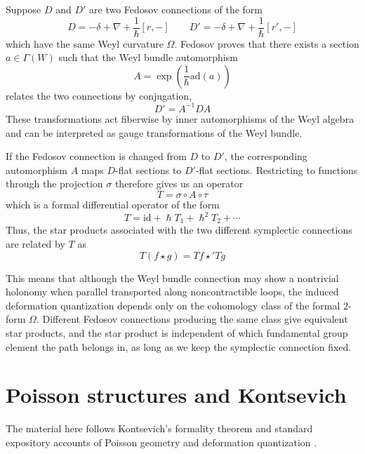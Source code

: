 \documentclass[
  12pt,
  a4paper, oneside
]{report}
\renewcommand{\hbar}{\hslash}
\theoremstyle{bolddef}
\theoremstyle{remark}
\numberwithin{equation}{chapter}
\begin{document}
Suppose $D$ and $D'$ are two Fedosov connections of the form
$$
D = -\delta + \nabla + \frac{1}{\hbar}[r,-] \qquad 
D' = -\delta + \nabla + \frac{1}{\hbar}[r',-]
$$
which have the same Weyl curvature $\Omega$. Fedosov proves that there exists a section 
$a \in \Gamma(W)$ such that the Weyl bundle automorphism
$$
A = \exp\!\left(\frac{1}{\hbar}\mathrm{ad}(a)\right)
$$
relates the two connections by conjugation,
$$
D' = A^{-1} D A 
$$
These transformations act fiberwise by inner automorphisms of the Weyl algebra and can be interpreted as gauge transformations of the Weyl bundle.

If the Fedosov connection is changed from $D$ to $D'$, the corresponding automorphism $A$ maps 
$D$-flat sections to $D'$-flat sections. Restricting to functions through the projection $\sigma$ 
therefore gives us an operator
$$
T = \sigma \circ A \circ \tau 
$$
which is a formal differential operator of the form
\begin{equation}
T = \mathrm{id} + \hbar T_1 + \hbar^2 T_2 + \cdots 
\end{equation}
Thus, the star products associated with the two different symplectic connections are related by $T$ as 
$$
T(f \star g) = Tf \star' Tg 
$$


This means that although the Weyl bundle connection may show a  nontrivial holonomy when parallel transported 
along noncontractible loops, the induced deformation quantization depends only on the cohomology 
class of the formal $2$-form $\Omega$. Different Fedosov connections producing the same class give equivalent star products, and the star product is independent of which fundamental group element the path belongs in, as long as we keep the symplectic connection fixed. 

\section{Poisson structures and Kontsevich}
The material here follows Kontsevich's formality theorem and standard expository accounts of Poisson geometry and deformation quantization \cite{Kontsevich2003,GraciaSaz2003,CannasdaSilva2001}.
\end{document}
